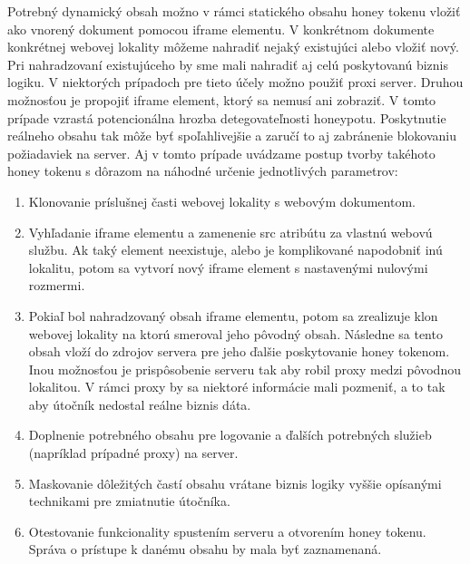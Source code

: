 \documentclass[conference, 11pt,slovak,a4paper,twoside]{IEEEtran}
\begin{document}
Potrebný dynamický obsah možno v rámci statického obsahu honey tokenu vložiť ako vnorený dokument pomocou iframe elementu. V konkrétnom dokumente konkrétnej webovej lokality môžeme nahradiť nejaký existujúci alebo vložiť nový. Pri nahradzovaní existujúceho by sme mali nahradiť aj celú poskytovanú biznis logiku. V niektorých prípadoch pre tieto účely možno použiť proxi server. Druhou možnosťou je propojiť iframe element, ktorý sa nemusí ani zobraziť. V tomto prípade vzrastá potencionálna hrozba detegovateľnosti honeypotu. Poskytnutie reálneho obsahu tak môže byť spoľahlivejšie a zaručí to aj zabránenie blokovaniu požiadaviek na server. Aj v tomto prípade uvádzame postup tvorby takéhoto honey tokenu s dôrazom na náhodné určenie jednotlivých parametrov:

\begin{enumerate}
	\item Klonovanie príslušnej časti webovej lokality s webovým dokumentom.

	\item Vyhľadanie iframe elementu a zamenenie src atribútu za vlastnú webovú službu. Ak taký element neexistuje, alebo je komplikované napodobniť inú lokalitu, potom sa vytvorí nový iframe element s nastavenými nulovými rozmermi.
	
	\item Pokiaľ bol nahradzovaný obsah iframe elementu, potom sa zrealizuje klon webovej lokality na ktorú smeroval jeho pôvodný obsah. Následne sa tento obsah vloží do zdrojov servera pre jeho ďalšie poskytovanie honey tokenom. Inou možnosťou je prispôsobenie serveru tak aby robil proxy medzi pôvodnou lokalitou. V rámci proxy by sa niektoré informácie mali pozmeniť, a to tak aby útočník nedostal reálne biznis dáta.
	
	\item Doplnenie potrebného obsahu pre logovanie a ďalších potrebných služieb (napríklad prípadné proxy) na server.
	
	\item Maskovanie dôležitých častí obsahu vrátane biznis logiky vyššie opísanými technikami pre zmiatnutie útočníka.
	
	\item Otestovanie funkcionality spustením serveru a otvorením honey tokenu. Správa o prístupe k danému obsahu by mala byť zaznamenaná.
\end{enumerate}
\end{document}
